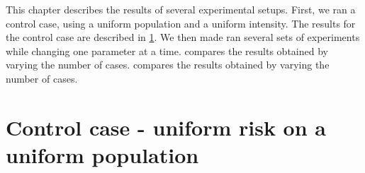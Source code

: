 
This chapter describes the results of several experimental setups.
First, we ran a control case, using a uniform population and a uniform intensity.
The results for the control case are described in \cref{sec:results:unif_100_unif}.
We then made ran several sets of experiments while changing one parameter at a time.
 compares the results obtained by varying the number of cases.
 compares the results obtained by varying the number of cases.


\section{Control case - uniform risk on a uniform population}
\label{sec:results:unif_100_unif}

